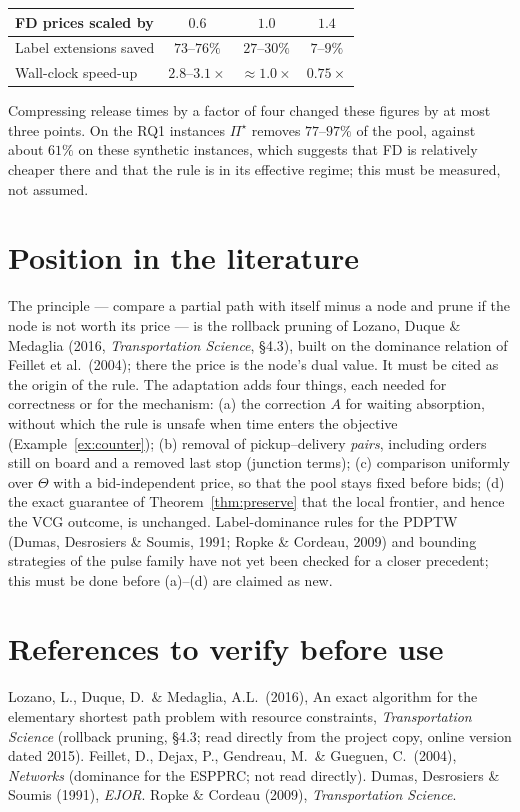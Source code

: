 \documentclass[11pt]{article}
\theoremstyle{definition}
\theoremstyle{remark}
\newcommand{\0}{\mathbf{0}}
\begin{document}
\begin{center}
\begin{tabular}{@{}lccc@{}}
\toprule
FD prices scaled by & $0.6$ & $1.0$ & $1.4$\\
\midrule
Label extensions saved & $73$--$76\%$ & $27$--$30\%$ & $7$--$9\%$\\
Wall-clock speed-up & $2.8$--$3.1\times$ & $\approx1.0\times$ & $0.75\times$\\
\bottomrule
\end{tabular}
\end{center}

Compressing release times by a factor of four changed these figures by at most three points. On
the RQ1 instances $\Pi^\star$ removes $77$--$97\%$ of the pool, against about $61\%$ on these synthetic
instances, which suggests that FD is relatively cheaper there and that the rule is in its
effective regime; this must be measured, not assumed.

\section{Position in the literature}

The principle --- compare a partial path with itself minus a node and prune if the node is not
worth its price --- is the rollback pruning of Lozano, Duque \& Medaglia (2016,
\emph{Transportation Science}, \S4.3), built on the dominance relation of Feillet et al.\ (2004);
there the price is the node's dual value. It must be cited as the origin of the rule. The
adaptation adds four things, each needed for correctness or for the mechanism: (a) the
correction $A$ for waiting absorption, without which the rule is unsafe when time enters the
objective (Example~\ref{ex:counter}); (b) removal of pickup--delivery \emph{pairs}, including
orders still on board and a removed last stop (junction terms); (c) comparison uniformly over
$\Theta$ with a bid-independent price, so that the pool stays fixed before bids; (d) the exact
guarantee of Theorem~\ref{thm:preserve} that the local frontier, and hence the VCG outcome, is
unchanged. Label-dominance rules for the PDPTW (Dumas, Desrosiers \& Soumis, 1991; Ropke \&
Cordeau, 2009) and bounding strategies of the pulse family have not yet been checked for a closer
precedent; this must be done before (a)--(d) are claimed as new.

\section*{References to verify before use}
Lozano, L., Duque, D.\ \& Medaglia, A.L.\ (2016), An exact algorithm for the elementary
shortest path problem with resource constraints, \emph{Transportation Science} (rollback
pruning, \S4.3; read directly from the project copy, online version dated 2015).
Feillet, D., Dejax, P., Gendreau, M.\ \& Gueguen, C.\ (2004), \emph{Networks} (dominance for the
ESPPRC; not read directly). Dumas, Desrosiers \& Soumis (1991), \emph{EJOR}. Ropke \& Cordeau
(2009), \emph{Transportation Science}.
\end{document}
